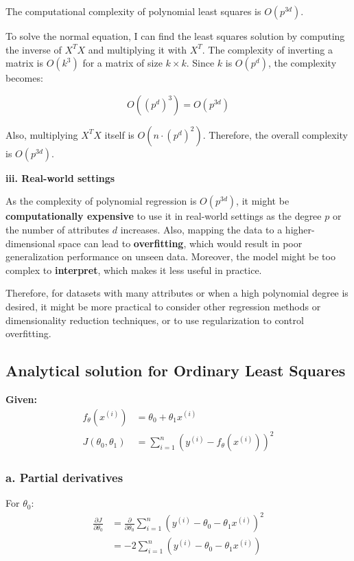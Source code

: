 \documentclass[10pt]{article}
\begin{document}
The computational complexity of polynomial least squares is \( O(p^{3d}) \).

To solve the normal equation, I can find the least squares solution by computing the inverse of \( X^TX \) and multiplying it with \( X^T \). The complexity of inverting a matrix is \( O(k^3) \) for a matrix of size \( k \times k \). Since \( k \) is \( O(p^d) \), the complexity becomes:

\[
O((p^d)^3) = O(p^{3d})
\]

Also, multiplying \( X^TX \) itself is \( O(n \cdot (p^d)^2) \). Therefore, the overall complexity is \( O(p^{3d}) \).

\textbf{iii. Real-world settings}

As the complexity of polynomial regression is \( O(p^{3d}) \), it might be \textbf{computationally expensive} to use it in real-world settings as the degree \( p \) or the number of attributes \( d \) increases. Also, mapping the data to a higher-dimensional space can lead to \textbf{overfitting}, which would result in poor generalization performance on unseen data. Moreover, the model might be too complex to \textbf{interpret}, which makes it less useful in practice.

Therefore, for datasets with many attributes or when a high polynomial degree is desired, it might be more practical to consider other regression methods or dimensionality reduction techniques, or to use regularization to control overfitting.


\subsection{Analytical solution for Ordinary Least Squares}

\textbf{Given:}
\begin{align*}
f_{\theta}(x^{(i)}) &= \theta_0 + \theta_1 x^{(i)} \\
J(\theta_0, \theta_1) &= \sum_{i=1}^{n} (y^{(i)} - f_{\theta}(x^{(i)}))^2
\end{align*}

\subsubsection*{a. Partial derivatives}

For \( \theta_0 \):
\begin{align*}
\frac{\partial J}{\partial \theta_0} &= \frac{\partial}{\partial \theta_0} \sum_{i=1}^{n} (y^{(i)} - \theta_0 - \theta_1 x^{(i)})^2 \\
&= -2\sum_{i=1}^{n} (y^{(i)} - \theta_0 - \theta_1 x^{(i)})
\end{align*}
\end{document}
